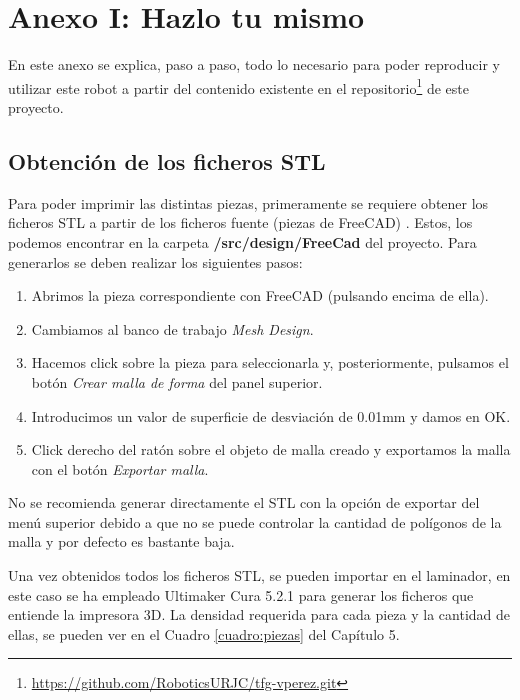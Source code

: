 \chapter*{Anexo I: Hazlo tu mismo}
\label{cap:anexoi}

\noindent En este anexo se explica, paso a paso, todo lo necesario para poder reproducir y utilizar este robot a partir del contenido 
existente en el repositorio\footnote{\url{https://github.com/RoboticsURJC/tfg-vperez.git}} de este proyecto.

\section*{Obtención de los ficheros STL}
\noindent Para poder imprimir las distintas piezas, primeramente se requiere obtener los ficheros STL a partir de los ficheros fuente (piezas de FreeCAD) . 
Estos, los podemos encontrar en la carpeta \textbf{/src/design/FreeCad} del proyecto. Para generarlos se deben realizar los siguientes pasos:
\begin{enumerate}
\item Abrimos la pieza correspondiente con FreeCAD (pulsando encima de ella).
\item Cambiamos al banco de trabajo \textit{Mesh Design}.
\item Hacemos click sobre la pieza para seleccionarla y, posteriormente, pulsamos el botón \textit{Crear malla de forma} del panel superior.
\item Introducimos un valor de superficie de desviación de 0.01mm y damos en OK.
\item Click derecho del ratón sobre el objeto de malla creado y exportamos la malla con el botón \textit{Exportar malla}. 
\end{enumerate}

\begin{tcolorbox}[colback=blue!5!white,colframe=blue!75!black,title=Nota]
    No se recomienda generar directamente el STL con la opción de exportar del menú superior debido a que no se puede controlar la cantidad de polígonos 
    de la malla y por defecto es bastante baja.
\end{tcolorbox}

Una vez obtenidos todos los ficheros STL, se pueden importar en el laminador, en este caso se ha empleado 
Ultimaker Cura 5.2.1 para generar los ficheros que entiende la impresora 3D. La densidad requerida para cada pieza 
y la cantidad de ellas, se pueden ver en el Cuadro \ref{cuadro:piezas} del Capítulo 5.

